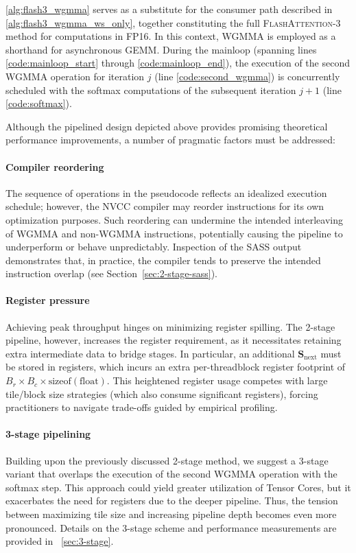 \cref{alg:flash3_wgmma} serves as a substitute for the consumer path described in \cref{alg:flash3_wgmma_ws_only}, together constituting the full \textsc{FlashAttention-3} method for computations in FP16. In this context, WGMMA is employed as a shorthand for asynchronous GEMM. During the mainloop (spanning lines \ref{code:mainloop_start} through \ref{code:mainloop_end}), the execution of the second WGMMA operation for iteration $j$ (line \ref{code:second_wgmma}) is concurrently scheduled with the softmax computations of the subsequent iteration $j+1$ (line \ref{code:softmax}).

Although the pipelined design depicted above provides promising theoretical performance improvements, a number of pragmatic factors must be addressed:
\paragraph{Compiler reordering} The sequence of operations in the pseudocode reflects an idealized execution schedule; however, the NVCC compiler may reorder instructions for its own optimization purposes. Such reordering can undermine the intended interleaving of WGMMA and non-WGMMA instructions, potentially causing the pipeline to underperform or behave unpredictably. Inspection of the SASS output demonstrates that, in practice, the compiler tends to preserve the intended instruction overlap (see Section~\ref{sec:2-stage-sass}).
\paragraph{Register pressure} Achieving peak throughput hinges on minimizing register spilling. The 2-stage pipeline, however, increases the register requirement, as it necessitates retaining extra intermediate data to bridge stages. In particular, an additional $\mathbf{S}_{\mathrm{next}}$ must be stored in registers, which incurs an extra per-threadblock register footprint of $B_r \times B_c \times \text{sizeof}(\text{float})$. This heightened register usage competes with large tile/block size strategies (which also consume significant registers), forcing practitioners to navigate trade-offs guided by empirical profiling.
\paragraph{3-stage pipelining} Building upon the previously discussed 2-stage method, we suggest a 3-stage variant that overlaps the execution of the second WGMMA operation with the softmax step. This approach could yield greater utilization of Tensor Cores, but it exacerbates the need for registers due to the deeper pipeline. Thus, the tension between maximizing tile size and increasing pipeline depth becomes even more pronounced. Details on the 3-stage scheme and performance measurements are provided in ~\cref{sec:3-stage}.

